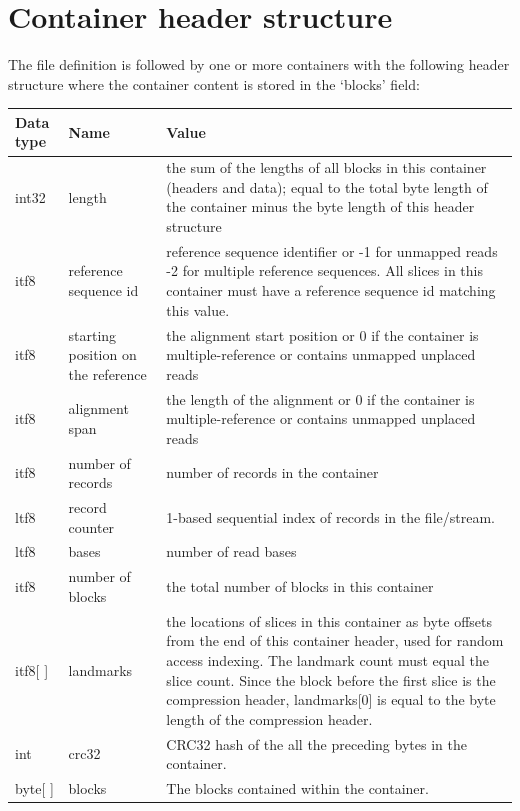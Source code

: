 \documentclass[a4paper]{article}
\begin{document}
\section{\textbf{Container header structure}}

The file definition is followed by one or more containers with the following header 
structure where the container content is stored in the `blocks' field:

\begin{tabular}{|l|>{\raggedright}p{120pt}|>{\raggedright}p{260pt}|}
\hline
\textbf{Data type} & \textbf{Name} & \textbf{Value}
\tabularnewline
\hline
int32 & length & the sum of the lengths of all blocks in this container (headers and data); 
equal to the total byte length of the container minus the byte length of this header structure\tabularnewline
\hline
itf8 & reference sequence id & reference sequence identifier  or\linebreak{}
-1 for unmapped reads\linebreak{}
-2 for multiple reference sequences.\linebreak{}
All slices in this container must have a reference sequence id matching this value.\tabularnewline
\hline
itf8 & starting position on the reference & the alignment start position or\linebreak{}
0 if the container is multiple-reference
or contains unmapped unplaced reads\tabularnewline
\hline
itf8 & alignment span & the length of the alignment or\linebreak{}
0 if the container is multiple-reference
or contains unmapped unplaced reads\tabularnewline
\hline
itf8 & number of records & number of records in the container\tabularnewline
\hline
ltf8 & record counter & 1-based sequential index of records in the file/stream.\tabularnewline
\hline
ltf8 & bases & number of read bases\tabularnewline
\hline
itf8 & number of blocks & the total number of blocks in this container\tabularnewline
\hline
itf8[ ] & landmarks & the locations of slices in this container as byte offsets from the end of 
this container header, used for random access indexing.
The landmark count must equal the slice count.\linebreak{}
Since the block before the first slice is the compression header,
landmarks[0] is equal to the byte length of the compression header.\tabularnewline
\hline
int & crc32 & CRC32 hash of the all the preceding bytes in the container.\tabularnewline
\hline
byte[ ] & blocks & The blocks contained within the container.\tabularnewline
\hline
\end{tabular}
\end{document}
